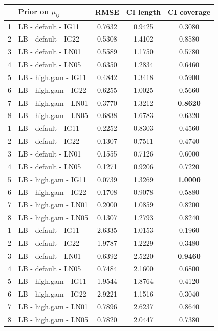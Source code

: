 \documentclass{amsart}
\begin{document}
\begin{table}[ht]
\centering
\begin{tabular}{l|l|ccc}
  \toprule
 & Prior on $\mu_{ij}$ & RMSE & CI length & CI coverage \\ 
  \midrule
1 & LB - default - IG11 & 0.7632 & 0.9425 & 0.3080 \\ 
  2 & LB - default - IG22 & 0.5308 & 1.4102 & 0.8580 \\ 
  3 & LB - default - LN01 & 0.5589 & 1.1750 & 0.5780 \\ 
  4 & LB - default - LN05 & 0.6350 & 1.2834 & 0.6460 \\ 
  5 & LB - high.gam - IG11 & 0.4842 & 1.3418 & 0.5900 \\ 
  6 & LB - high.gam - IG22 & 0.6255 & 1.0025 & 0.5660 \\ 
  7 & LB - high.gam - LN01 & 0.3770 & 1.3212 & \textbf{0.8620} \\ 
  8 & LB - high.gam - LN05 & 0.6838 & 1.6783 & 0.6320 \\ 
   \midrule
1 & LB - default - IG11 & 0.2252 & 0.8303 & 0.4560 \\ 
  2 & LB - default - IG22 & 0.1307 & 0.7511 & 0.4740 \\ 
  3 & LB - default - LN01 & 0.1555 & 0.7126 & 0.6000 \\ 
  4 & LB - default - LN05 & 0.1271 & 0.9206 & 0.7220 \\ 
  5 & LB - high.gam - IG11 & 0.0739 & 1.3269 & \textbf{1.0000} \\ 
  6 & LB - high.gam - IG22 & 0.1708 & 0.9078 & 0.5880 \\ 
  7 & LB - high.gam - LN01 & 0.2000 & 1.0859 & 0.8200 \\ 
  8 & LB - high.gam - LN05 & 0.1307 & 1.2793 & 0.8240 \\ 
   \midrule
1 & LB - default - IG11 & 2.6335 & 1.0153 & 0.1960 \\ 
  2 & LB - default - IG22 & 1.9787 & 1.2229 & 0.3480 \\ 
  3 & LB - default - LN01 & 0.6392 & 2.5220 & \textbf{0.9460} \\ 
  4 & LB - default - LN05 & 0.7484 & 2.1600 & 0.6800 \\ 
  5 & LB - high.gam - IG11 & 1.9544 & 1.8764 & 0.4120 \\ 
  6 & LB - high.gam - IG22 & 2.9221 & 1.1516 & 0.3040 \\ 
  7 & LB - high.gam - LN01 & 0.7896 & 2.6237 & 0.8640 \\ 
  8 & LB - high.gam - LN05 & 0.7820 & 2.0447 & 0.7380 \\ 

\end{tabular}
\end{table}
\end{document}
